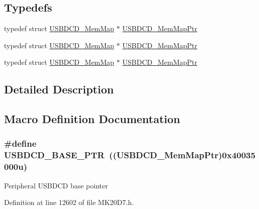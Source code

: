 \subsection*{Typedefs}
\begin{DoxyCompactItemize}
\item 
typedef struct \hyperlink{struct_u_s_b_d_c_d___mem_map}{U\+S\+B\+D\+C\+D\+\_\+\+Mem\+Map} $\ast$ \hyperlink{group___u_s_b_d_c_d___peripheral_gad6e68bd3ca7f14168c34ff5e824dd321}{U\+S\+B\+D\+C\+D\+\_\+\+Mem\+Map\+Ptr}
\item 
typedef struct \hyperlink{struct_u_s_b_d_c_d___mem_map}{U\+S\+B\+D\+C\+D\+\_\+\+Mem\+Map} $\ast$ \hyperlink{group___u_s_b_d_c_d___peripheral_gad6e68bd3ca7f14168c34ff5e824dd321}{U\+S\+B\+D\+C\+D\+\_\+\+Mem\+Map\+Ptr}
\item 
typedef struct \hyperlink{struct_u_s_b_d_c_d___mem_map}{U\+S\+B\+D\+C\+D\+\_\+\+Mem\+Map} $\ast$ \hyperlink{group___u_s_b_d_c_d___peripheral_gad6e68bd3ca7f14168c34ff5e824dd321}{U\+S\+B\+D\+C\+D\+\_\+\+Mem\+Map\+Ptr}
\end{DoxyCompactItemize}


\subsection{Detailed Description}


\subsection{Macro Definition Documentation}
\subsubsection[{\texorpdfstring{U\+S\+B\+D\+C\+D\+\_\+\+B\+A\+S\+E\+\_\+\+P\+TR}{USBDCD_BASE_PTR}}]{\setlength{\rightskip}{0pt plus 5cm}\#define U\+S\+B\+D\+C\+D\+\_\+\+B\+A\+S\+E\+\_\+\+P\+TR~(({\bf U\+S\+B\+D\+C\+D\+\_\+\+Mem\+Map\+Ptr})0x40035000u)}\hypertarget{group___u_s_b_d_c_d___peripheral_ga6289dc687e9b991508629237aeb61755}{}\label{group___u_s_b_d_c_d___peripheral_ga6289dc687e9b991508629237aeb61755}
Peripheral U\+S\+B\+D\+CD base pointer 

Definition at line 12602 of file M\+K20\+D7.\+h.

